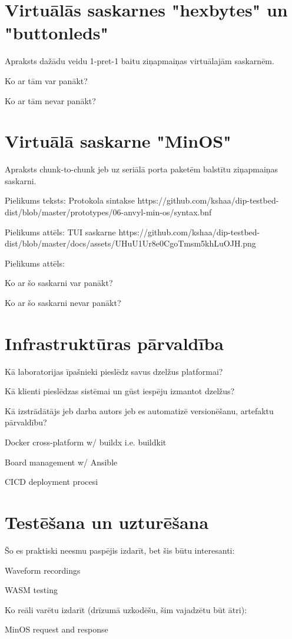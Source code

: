 \section{Virtuālās saskarnes "hexbytes" un "buttonleds"}

Apraksts dažādu veidu 1-pret-1 baitu ziņapmaiņas virtuālajām saskarnēm.

Ko ar tām var panākt?

Ko ar tām nevar panākt?

\section{Virtuālā saskarne "MinOS"}

Apraksts chunk-to-chunk jeb uz seriālā porta paketēm balstītu ziņapmaiņas saskarni.

Pielikums teksts: Protokola sintakse https://github.com/kshaa/dip-testbed-dist/blob/master/prototypes/06-anvyl-min-os/syntax.bnf  

Pielikums attēls: TUI saskarne https://github.com/kshaa/dip-testbed-dist/blob/master/docs/assets/UHuU1Ur8e0CgoTmsm5khLuOJH.png

Pielikums attēls: 

Ko ar šo saskarni var panākt?

Ko ar šo saskarni nevar panākt?

\section{Infrastruktūras pārvaldība}

Kā laboratorijas īpašnieki pieslēdz savus dzelžus platformai?

Kā klienti pieslēdzas sistēmai un gūst iespēju izmantot dzelžus?

Kā izstrādātājs jeb darba autors jeb es automatizē versionēšanu, artefaktu pārvaldību?

Docker cross-platform w/ buildx i.e. buildkit

Board management w/ Ansible

CICD deployment procesi

\section{Testēšana un uzturēšana}

Šo es praktiski neesmu paspējis izdarīt, bet šis būtu interesanti:

Waveform recordings

WASM testing

Ko reāli varētu izdarīt (drīzumā uzkodēšu, šim vajadzētu būt ātri):

MinOS request and response

